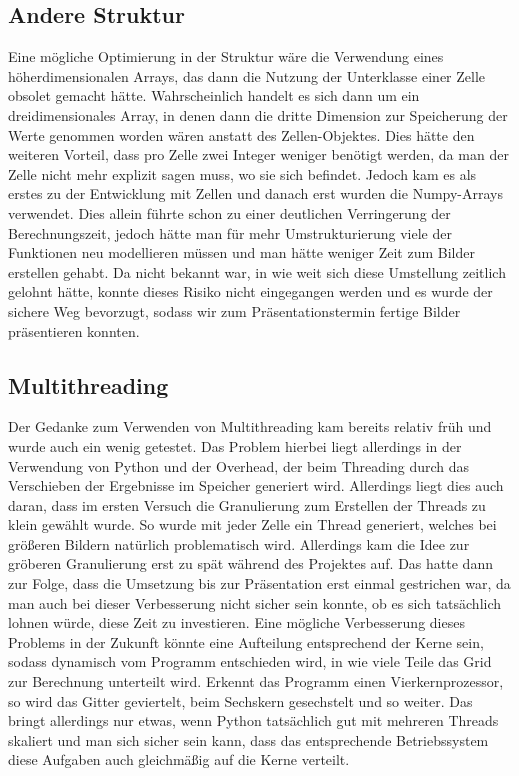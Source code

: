 \documentclass[]{article}
\begin{document}
\subsection{Andere Struktur}
Eine m\"ogliche Optimierung in der Struktur w\"are die Verwendung eines h\"oherdimensionalen Arrays, das dann die Nutzung der Unterklasse einer Zelle obsolet gemacht h\"atte. Wahrscheinlich handelt es sich dann um ein dreidimensionales Array, in denen dann die dritte Dimension zur Speicherung der Werte genommen worden w\"aren anstatt des Zellen-Objektes.
Dies h\"atte den weiteren Vorteil, dass pro Zelle zwei Integer weniger ben\"otigt werden, da man der Zelle nicht mehr explizit sagen muss, wo sie sich befindet.
Jedoch kam es als erstes zu der Entwicklung mit Zellen und danach erst wurden die Numpy-Arrays verwendet. Dies allein f\"uhrte schon zu einer deutlichen Verringerung der Berechnungszeit, jedoch h\"atte man f\"ur mehr Umstrukturierung viele der Funktionen neu modellieren m\"ussen und man h\"atte weniger Zeit zum Bilder erstellen gehabt. Da nicht bekannt war, in wie weit sich diese Umstellung zeitlich gelohnt h\"atte, konnte dieses Risiko nicht eingegangen werden und es wurde der sichere Weg bevorzugt, sodass wir zum Pr\"asentationstermin fertige Bilder pr\"asentieren konnten.

\subsection{Multithreading}
Der Gedanke zum Verwenden von Multithreading kam bereits relativ fr\"uh und wurde auch ein wenig getestet. Das Problem hierbei liegt allerdings in der Verwendung von Python und der Overhead, der beim Threading durch das Verschieben der Ergebnisse im Speicher generiert wird. 
Allerdings liegt dies auch daran, dass im ersten Versuch die Granulierung zum Erstellen der Threads zu klein gew\"ahlt wurde. So wurde mit jeder Zelle ein Thread generiert, welches bei gr\"o\ss eren Bildern nat\"urlich problematisch wird. Allerdings kam die Idee zur gr\"oberen Granulierung erst zu sp\"at w\"ahrend des Projektes auf. Das hatte dann zur Folge, dass die Umsetzung bis zur Pr\"asentation erst einmal gestrichen war, da man auch bei dieser Verbesserung nicht sicher sein konnte, ob es sich  tats\"achlich lohnen w\"urde, diese Zeit zu investieren.
Eine m\"ogliche Verbesserung dieses Problems in der Zukunft  k\"onnte eine Aufteilung entsprechend der Kerne sein, sodass dynamisch vom Programm entschieden wird, in wie viele Teile das Grid zur Berechnung unterteilt wird. Erkennt das Programm einen Vierkernprozessor, so wird das Gitter geviertelt, beim Sechskern gesechstelt und so weiter. Das bringt allerdings nur etwas, wenn Python tats\"achlich gut mit mehreren Threads skaliert und man sich sicher sein kann, dass das entsprechende Betriebssystem diese Aufgaben auch gleichm\"a\ss ig auf die Kerne verteilt.
\end{document}
